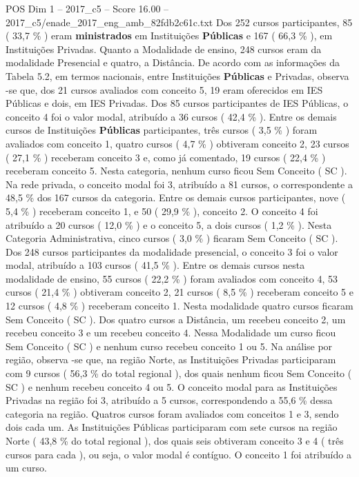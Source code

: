 \begin{textsample}{POS Dim 1 – 2017\_c5 – Score 16.00 – 2017\_c5/enade\_2017\_eng\_amb\_82fdb2c61c.txt}
Dos 252 cursos participantes, 85 ( 33,7 \% ) eram \textbf{ministrados} em Instituições \textbf{Públicas} e 167 ( 66,3 \% ), em Instituições Privadas.
Quanto a Modalidade de ensino, 248 cursos eram da modalidade Presencial e quatro, a Distância.
De acordo com as informações da Tabela 5.2, em termos nacionais, entre Instituições \textbf{Públicas} e Privadas, observa -se que, dos 21 cursos avaliados com conceito 5, 19 eram oferecidos em IES Públicas e dois, em IES Privadas.
Dos 85 cursos participantes de IES Públicas, o conceito 4 foi o valor modal, atribuído a 36 cursos ( 42,4 \% ).
Entre os demais cursos de Instituições \textbf{Públicas} participantes, três cursos ( 3,5 \% ) foram avaliados com conceito 1, quatro cursos ( 4,7 \% ) obtiveram conceito 2, 23 cursos ( 27,1 \% ) receberam conceito 3 e, como já comentado, 19 cursos ( 22,4 \% ) receberam conceito 5.
Nesta categoria, nenhum curso ficou Sem Conceito ( SC ).
Na rede privada, o conceito modal foi 3, atribuído a 81 cursos, o correspondente a 48,5 \% dos 167 cursos da categoria.
Entre os demais cursos participantes, nove ( 5,4 \% ) receberam conceito 1, e 50 ( 29,9 \% ), conceito 2.
O conceito 4 foi atribuído a 20 cursos ( 12,0 \% ) e o conceito 5, a dois cursos ( 1,2 \% ).
Nesta Categoria Administrativa, cinco cursos ( 3,0 \% ) ficaram Sem Conceito ( SC ).
Dos 248 cursos participantes da modalidade presencial, o conceito 3 foi o valor modal, atribuído a 103 cursos ( 41,5 \% ).
Entre os demais cursos nesta modalidade de ensino, 55 cursos ( 22,2 \% ) foram avaliados com conceito 4, 53 cursos ( 21,4 \% ) obtiveram conceito 2, 21 cursos ( 8,5 \% ) receberam conceito 5 e 12 cursos ( 4,8 \% ) receberam conceito 1.
Nesta modalidade quatro cursos ficaram Sem Conceito ( SC ).
Dos quatro cursos a Distância, um recebeu conceito 2, um recebeu conceito 3 e um recebeu conceito 4.
Nessa Modalidade um curso ficou Sem Conceito ( SC ) e nenhum curso recebeu conceito 1 ou 5.
Na análise por região, observa -se que, na região Norte, as Instituições Privadas participaram com 9 cursos ( 56,3 \% do total regional ), dos quais nenhum ficou Sem Conceito ( SC ) e nenhum recebeu conceito 4 ou 5.
O conceito modal para as Instituições Privadas na região foi 3, atribuído a 5 cursos, correspondendo a 55,6 \% dessa categoria na região.
Quatros cursos foram avaliados com conceitos 1 e 3, sendo dois cada um.
As Instituições Públicas participaram com sete cursos na região Norte ( 43,8 \% do total regional ), dos quais seis obtiveram conceito 3 e 4 ( três cursos para cada ), ou seja, o valor modal é contíguo.
O conceito 1 foi atribuído a um curso.

\end{textsample}
